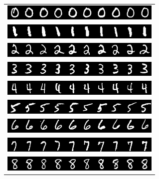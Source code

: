 \begin{figure}
\centering
\begin{subfigure}{0.45\textwidth}
\begin{tabular}{c}
  \includegraphics[width=0.9\linewidth]{predoc/images/0_ppv.png}\\
  \includegraphics[width=0.90\linewidth]{predoc/images/1_ppv.png}\\
  \includegraphics[width=0.90\linewidth]{predoc/images/2_ppv.png}\\
  \includegraphics[width=0.90\linewidth]{predoc/images/3_ppv.png}\\
  \includegraphics[width=0.90\linewidth]{predoc/images/4_ppv.png}\\
  \includegraphics[width=0.90\linewidth]{predoc/images/5_ppv.png}\\
  \includegraphics[width=0.90\linewidth]{predoc/images/6_ppv.png}\\
  \includegraphics[width=0.90\linewidth]{predoc/images/7_ppv.png}\\
  \includegraphics[width=0.90\linewidth]{predoc/images/8_ppv.png}\\

\end{tabular}
\end{subfigure}
\end{figure}
